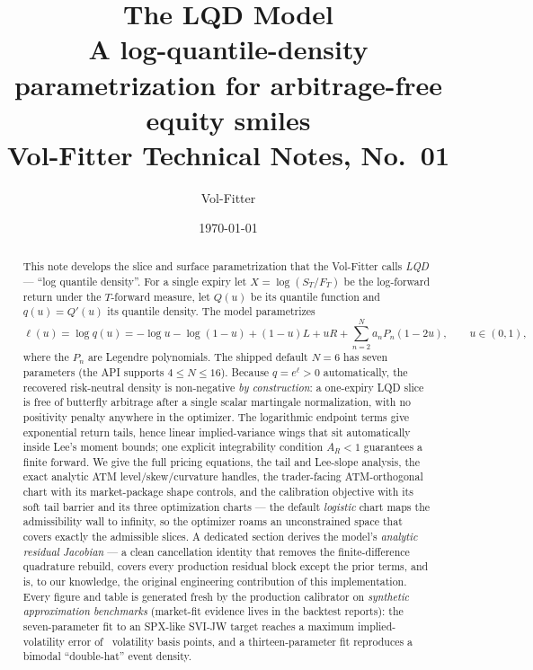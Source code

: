 \documentclass[11pt]{article}
\title{\textbf{The LQD Model}\\[2pt]
\large A log-quantile-density parametrization for arbitrage-free equity smiles\\[2pt]
\normalsize Vol-Fitter Technical Notes, No.~01}
\author{Vol-Fitter}
\date{\today}
\begin{document}
\maketitle



\begin{abstract}
This note develops the slice and surface parametrization that the Vol-Fitter calls
\emph{LQD} --- ``log quantile density''. For a single expiry let
$X=\log(S_T/F_T)$ be the log-forward return under the $T$-forward measure, let
$Q(u)$ be its quantile function and $q(u)=Q'(u)$ its quantile density. The model
parametrizes
\[
\ell(u)=\log q(u)=-\log u-\log(1-u)+(1-u)L+uR+\sum_{n=2}^{N}a_nP_n(1-2u),
\qquad u\in(0,1),
\]
where the $P_n$ are Legendre polynomials. The shipped default $N=6$ has seven
parameters (the API supports $4\le N\le16$). Because $q=e^{\ell}>0$ automatically, the recovered
risk-neutral density is non-negative \emph{by construction}: a one-expiry LQD
slice is free of butterfly arbitrage after a single scalar martingale
normalization, with no positivity penalty anywhere in the optimizer. The
logarithmic endpoint terms give exponential return tails, hence linear
implied-variance wings that sit automatically inside Lee's moment bounds; one
explicit integrability condition $A_R<1$ guarantees a finite forward. We give
the full pricing equations, the tail and Lee-slope analysis, the exact
analytic ATM level/skew/curvature handles, the trader-facing ATM-orthogonal
chart with its market-package shape controls, and the calibration objective
with its soft tail barrier and its three optimization charts --- the default
\emph{logistic} chart maps the admissibility wall to infinity, so the
optimizer roams an unconstrained space that covers exactly the admissible
slices. A dedicated section derives the model's \emph{analytic residual
Jacobian} --- a clean cancellation identity that removes the
finite-difference quadrature rebuild, covers every production residual block
except the prior terms, and is, to our knowledge, the original engineering
contribution of this implementation. Every figure and table is generated fresh by the production
calibrator on \emph{synthetic approximation benchmarks} (market-fit evidence
lives in the backtest reports): the seven-parameter fit to an SPX-like SVI-JW
target reaches a maximum implied-volatility error of \lqdsvimaxerr\ volatility
basis points, and a thirteen-parameter fit reproduces a bimodal ``double-hat''
event density.
\end{abstract}
\end{document}
